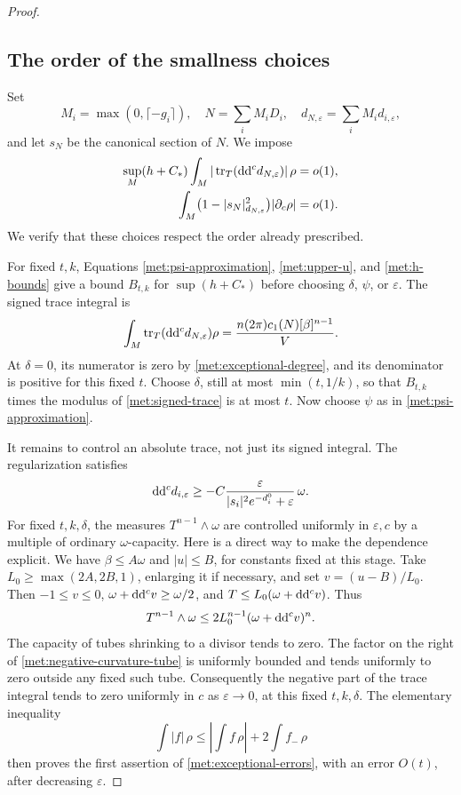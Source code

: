 \begin{proof}
\subsection*{The order of the smallness choices}

Set
\[
 M_i=\max(0,\lceil-g_i\rceil),
 \quad N=\sum_i M_iD_i,
 \quad d_{N,\varepsilon}=\sum_i M_i d_{i,\varepsilon},
\]
and let \(s_N\) be the canonical section of \(N\).  We impose
\begin{equation}
 \label{met:exceptional-errors}
 \begin{split}
 \sup_M(h+C_*)\int_M
       |\operatorname{tr}_T(\mathrm{d}\mathrm{d}^{c} d_{N,\varepsilon})|\,\rho&=o(1),\\
 \int_M\bigl(1-|s_N|_{d_{N,\varepsilon}}^2\bigr)
       |\partial_c\rho|&=o(1).
 \end{split}
\end{equation}
We verify that these choices respect the order already prescribed.

For fixed \(t,k\), Equations \eqref{met:psi-approximation},
\eqref{met:upper-u}, and \eqref{met:h-bounds} give a bound
\(B_{t,k}\) for \(\sup(h+C_*)\) before choosing \(\delta\),
\(\psi\), or \(\varepsilon\).  The signed trace integral is
\begin{equation}
 \label{met:signed-trace}
 \int_M\operatorname{tr}_T(\mathrm{d}\mathrm{d}^{c} d_{N,\varepsilon})\rho
   =\frac{n(2\pi)c_1(N)[\beta]^{n-1}}V.
\end{equation}
At \(\delta=0\), its numerator is zero by
\eqref{met:exceptional-degree}, and its denominator is positive for
this fixed \(t\).  Choose \(\delta\), still at most \(\min(t,1/k)\),
so that \(B_{t,k}\) times the modulus of
\eqref{met:signed-trace} is at most \(t\).  Now choose \(\psi\) as in
\eqref{met:psi-approximation}.

It remains to control an absolute trace, not just its signed integral.
The regularization satisfies
\begin{equation}
 \label{met:negative-curvature-tube}
 \mathrm{d}\mathrm{d}^{c} d_{i,\varepsilon}
 \geq-C\frac{\varepsilon}
 {|s_i|^2e^{-d_i^0}+\varepsilon}\,\omega.
\end{equation}
For fixed \(t,k,\delta\), the measures
\(T^{n-1}\wedge\omega\) are controlled uniformly in
\(\varepsilon,c\) by a multiple of ordinary \(\omega\)-capacity.
Here is a direct way to make the dependence explicit.  We have
\(\beta\leq A\omega\) and \(|u|\leq B\), for constants fixed at this
stage.  Take \(L_0\geq\max(2A,2B,1)\), enlarging it if necessary,
and set \(v=(u-B)/L_0\).  Then \(-1\leq v\leq0\),
\(\omega+\mathrm{d}\mathrm{d}^{c} v\geq\omega/2\), and
\(T\leq L_0(\omega+\mathrm{d}\mathrm{d}^{c} v)\).  Thus
\[
 T^{n-1}\wedge\omega
 \leq2L_0^{n-1}(\omega+\mathrm{d}\mathrm{d}^{c} v)^n.
\]
The capacity of tubes shrinking to a divisor tends to zero.  The
factor on the right of \eqref{met:negative-curvature-tube} is uniformly
bounded and tends uniformly to zero outside any fixed such tube.
Consequently the negative part of the trace integral tends to zero
uniformly in \(c\) as \(\varepsilon\to0\), at this fixed
\(t,k,\delta\).  The elementary inequality
\[
 \int|f|\,\rho
 \leq\left|\int f\,\rho\right|+2\int f_-\,\rho
\]
then proves the first assertion of \eqref{met:exceptional-errors},
with an error \(O(t)\), after decreasing \(\varepsilon\).


\end{proof}
